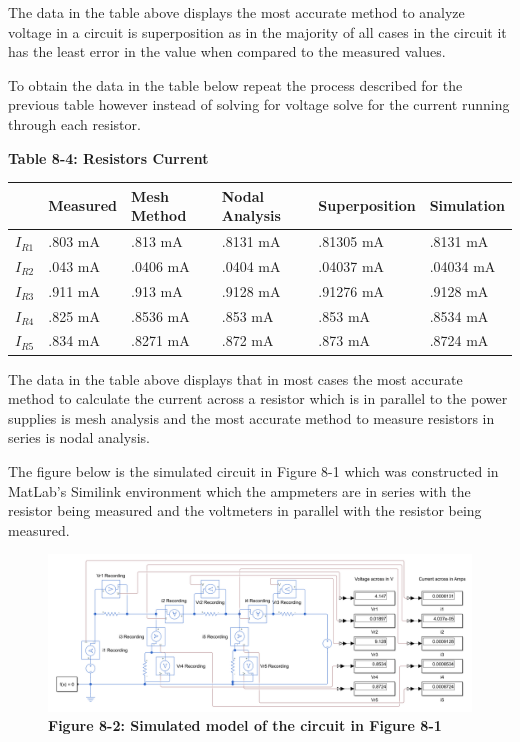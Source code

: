 \documentclass[a4paper]{article}
\begin{document}
The data in the table above displays the most accurate method to analyze voltage in a circuit is superposition as in the majority of all cases in the circuit it has the least error in the 
value when compared to the measured values.

To obtain the data in the table below repeat the process described for the previous table however instead of solving for voltage solve for the current running through each resistor.

\begin{center}
    \small\textbf{Table 8-4: Resistors Current}
    \begin{tabular}{|p{2 cm}|p{2cm}|p{2 cm}|p{2 cm}|p{2 cm}|p{2 cm}|}
        \hline
         & Measured & Mesh Method & Nodal Analysis & Superposition & Simulation \\
        \hline
        $I_{R1}$ & .803 mA  & .813 mA & .8131 mA & .81305 mA & .8131 mA \\
        \hline
        $I_{R2}$ & .043 mA & .0406 mA & .0404 mA & .04037 mA  & .04034 mA \\
        \hline
        $I_{R3}$ & .911 mA & .913 mA & .9128 mA & .91276 mA & .9128 mA \\
        \hline
        $I_{R4}$ &.825 mA & .8536 mA & .853 mA &  .853 mA & .8534 mA \\
        \hline
        $I_{R5}$ & .834 mA & .8271 mA & .872 mA & .873 mA & .8724 mA\\
        \hline
    \end{tabular}
\end{center}

The data in the table above displays that in most cases the most accurate method to calculate the current across a resistor which is in parallel to the power supplies
is mesh analysis and the most accurate method to measure resistors in series is nodal analysis.

The figure below is the simulated circuit in Figure 8-1 which was constructed in MatLab's Similink environment which the ampmeters are in series with the resistor being measured and the voltmeters in parallel 
with the resistor being measured.

\begin{center}
    \begin{figure}[H]\label{fig8-2}
        \begin{center}
            \includegraphics[width = 16 cm]{Figure_8-1}\\
            \small\textbf{Figure 8-2: Simulated model of the circuit in Figure 8-1}\\    
        \end{center}
    \end{figure}
\end{center}
\end{document}
